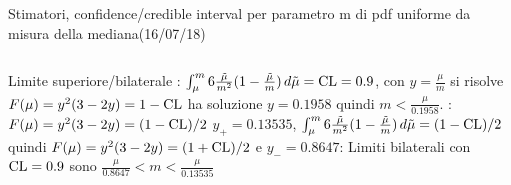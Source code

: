 \begin{wordonframe}{Stimatori, confidence/credible interval per parametro m di pdf uniforme da misura della mediana(16/07/18)}
\begin{columns}[T]
\begin{column}{0.5\textwidth}
\end{column}\end{columns}
\begin{block}{Limite superiore/bilaterale}
: $\int_{\mu}^m6\frac{\tilde{\mu}}{m^2}(1-\frac{\tilde{\mu}}{m})\,d\tilde{\mu}=\operatorname{CL}=0.9$, con $y=\frac{\mu}{m}$ si risolve $F(\mu)=y^2(3-2y)=1-\operatorname{CL}$ ha soluzione $y=0.1958$ quindi $m<\frac{\mu}{0.1958}$.
: $F(\mu)=y^2(3-2y)=(1-\operatorname{CL})/2$ $y_+=0.13535$, $\int_{\mu}^m6\frac{\tilde{\mu}}{m^2}(1-\frac{\tilde{\mu}}{m})\,d\tilde{\mu}=(1-\operatorname{CL})/2$ quindi $F(\mu)=y^2(3-2y)=(1+\operatorname{CL})/2$ e $y_-=0.8647$: Limiti bilaterali con $\operatorname{CL}=0.9$ sono $\frac{\mu}{0.8647}<m<\frac{\mu}{0.13535}$
\end{block}
\end{wordonframe}
